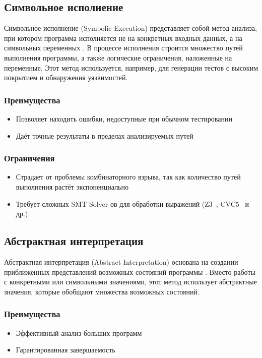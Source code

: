 \newpage
\subsection{Символьное исполнение}

Символьное исполнение (Symbolic Execution) представляет собой метод анализа, при котором программа исполняется не на конкретных входных данных, а на символьных переменных \cite{King76}. В процессе исполнения строится множество путей выполнения программы, а также логические ограничения, наложенные на переменные. Этот метод используется, например, для генерации тестов с высоким покрытием и обнаружения уязвимостей.

\subsubsection*{Преимущества}
\begin{itemize}
\item Позволяет находить ошибки, недоступные при обычном тестировании \cite{SymbolicTesting}
\item Даёт точные результаты в пределах анализируемых путей
\end{itemize}

\subsubsection*{Ограничения}
\begin{itemize}
\item Страдает от проблемы комбинаторного взрыва, так как количество путей выполнения растёт экспоненциально \cite{PathExplosion}
\item Требует сложных SMT Solver-ов для обработки выражений (Z3~\cite{Z3}, CVC5~\cite{CVC5} и др.)
\end{itemize}




\newpage
\subsection{Абстрактная интерпретация}

Абстрактная интерпретация (Abstract Interpretation) основана на создании приближённых представлений возможных состояний программы \cite{CousotCousot92}. Вместо работы с конкретными или символьными значениями, этот метод использует абстрактные значения, которые обобщают множества возможных состояний.

\subsubsection*{Преимущества}
\begin{itemize}
\item Эффективный анализ больших программ \cite{ScalingAI}
\item Гарантированная завершаемость
\end{itemize}

